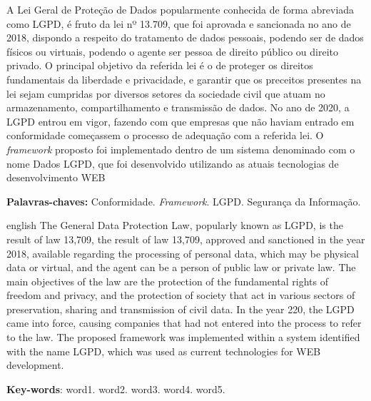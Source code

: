 \documentclass[
	12pt,				%
	openright,			%
	oneside,			%
	a4paper,			%
	english,			%
	french,				%
	spanish,			%
	brazil,				%
	]{abntex2}
\begin{document}
\begin{resumo}
\noindent
A Lei Geral de Proteção de Dados popularmente conhecida de forma abreviada como LGPD, é fruto da lei nº 13.709, que foi aprovada e sancionada no ano de 2018, dispondo a respeito do tratamento de dados pessoais, podendo ser de dados físicos ou virtuais, podendo o agente ser pessoa de direito público ou direito privado. O principal objetivo da referida lei é o de proteger os direitos fundamentais da liberdade e privacidade, e garantir que os preceitos presentes na lei sejam cumpridas por diversos setores da sociedade civil que atuam no armazenamento, compartilhamento e transmissão de dados. No ano de 2020, a LGPD entrou em vigor, fazendo com que empresas que não haviam entrado em conformidade começassem o processo de adequação com a referida lei. O \textit{framework} proposto foi implementado dentro de um sistema denominado com o nome Dados LGPD, que foi desenvolvido utilizando as atuais tecnologias de desenvolvimento WEB

 \vspace{\onelineskip}
    
 \noindent
 \textbf{Palavras-chaves:} Conformidade. \textit{Framework}. LGPD. Segurança da Informação.
\end{resumo}

\begin{resumo}[Abstract]
 \begin{otherlanguage*}{english}
   \vspace{\onelineskip}
    \noindent 
The General Data Protection Law, popularly known as LGPD, is the result of law 13,709, the result of law 13,709, approved and sanctioned in the year 2018, available regarding the processing of personal data, which may be physical data or virtual, and the agent can be a person of public law or private law. The main objectives of the law are the protection of the fundamental rights of freedom and privacy, and the protection of society that act in various sectors of preservation, sharing and transmission of civil data. In the year 220, the LGPD came into force, causing companies that had not entered into the process to refer to the law. The proposed framework was implemented within a system identified with the name LGPD, which was used as current technologies for WEB development.
   
   \vspace{\onelineskip}
   
   \noindent  \textbf{Key-words}:  word1. word2. word3. word4. word5.
 \end{otherlanguage*}
\end{resumo}
\end{document}
